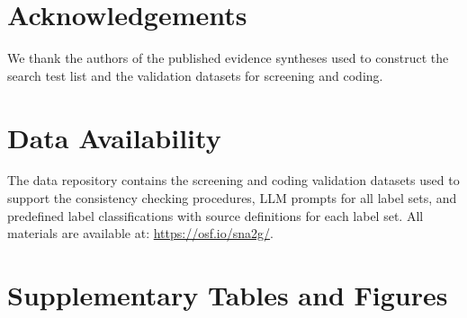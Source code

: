 \documentclass[12pt]{article}
\begin{document}
\section*{Acknowledgements}
We thank the authors of the published evidence syntheses used to construct the search test list and the validation datasets for screening and coding.

\section*{Data Availability}
The data repository contains the screening and coding validation 
datasets used to support the consistency checking procedures, 
LLM prompts for all label sets, and 
predefined label classifications with source definitions for each 
label set. All materials are available at: \url{https://osf.io/sna2g/}.


\newpage




\newpage
\appendix

\section*{Supplementary Tables and Figures}

\setcounter{table}{0}
\setcounter{figure}{0}

\renewcommand{\thetable}{\arabic{table}}
\renewcommand{\thefigure}{\arabic{figure}}
\renewcommand{\tablename}{Supplementary Table}
\renewcommand{\figurename}{Supplementary Figure}
\newpage
\end{document}
